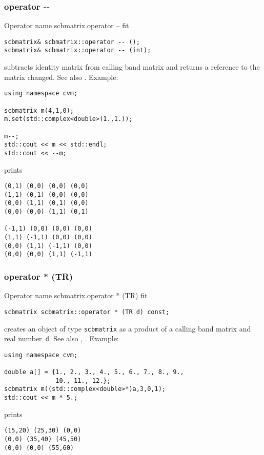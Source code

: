 \subsubsection{operator -{}-}
Operator%
\pdfdest name {scbmatrix.operator --} fit
\begin{verbatim}
scbmatrix& scbmatrix::operator -- ();
scbmatrix& scbmatrix::operator -- (int);
\end{verbatim}
subtracts identity matrix from  calling band matrix
and returns a reference to
the matrix changed.
See also .
Example:
\begin{Verbatim}
using namespace cvm;

scbmatrix m(4,1,0);
m.set(std::complex<double>(1.,1.));

m--;
std::cout << m << std::endl;
std::cout << --m;
\end{Verbatim}
prints
\begin{Verbatim}
(0,1) (0,0) (0,0) (0,0)
(1,1) (0,1) (0,0) (0,0)
(0,0) (1,1) (0,1) (0,0)
(0,0) (0,0) (1,1) (0,1)

(-1,1) (0,0) (0,0) (0,0)
(1,1) (-1,1) (0,0) (0,0)
(0,0) (1,1) (-1,1) (0,0)
(0,0) (0,0) (1,1) (-1,1)
\end{Verbatim}
\newpage




\subsubsection{operator * (TR)}
Operator%
\pdfdest name {scbmatrix.operator * (TR)} fit
\begin{verbatim}
scbmatrix scbmatrix::operator * (TR d) const;
\end{verbatim}
creates an object of type \verb"scbmatrix" as a product of
a calling band matrix and  real number~\verb"d".
See also ,
.
Example:
\begin{Verbatim}
using namespace cvm;

double a[] = {1., 2., 3., 4., 5., 6., 7., 8., 9.,
              10., 11., 12.};
scbmatrix m((std::complex<double>*)a,3,0,1);
std::cout << m * 5.;
\end{Verbatim}
prints
\begin{Verbatim}
(15,20) (25,30) (0,0)
(0,0) (35,40) (45,50)
(0,0) (0,0) (55,60)
\end{Verbatim}
\newpage



